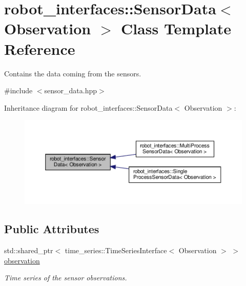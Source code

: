 \hypertarget{classrobot__interfaces_1_1SensorData}{}\section{robot\+\_\+interfaces\+:\+:Sensor\+Data$<$ Observation $>$ Class Template Reference}
\label{classrobot__interfaces_1_1SensorData}


Contains the data coming from the sensors.  




{\ttfamily \#include $<$sensor\+\_\+data.\+hpp$>$}



Inheritance diagram for robot\+\_\+interfaces\+:\+:Sensor\+Data$<$ Observation $>$\+:
\nopagebreak
\begin{figure}[H]
\begin{center}
\leavevmode
\includegraphics[width=350pt]{classrobot__interfaces_1_1SensorData__inherit__graph}
\end{center}
\end{figure}
\subsection*{Public Attributes}
\begin{DoxyCompactItemize}
\item 
\mbox{\label{classrobot__interfaces_1_1SensorData_afb270cde8fa55814d76787589f05ce44}} 
std\+::shared\+\_\+ptr$<$ time\+\_\+series\+::\+Time\+Series\+Interface$<$ Observation $>$ $>$ \hyperlink{classrobot__interfaces_1_1SensorData_afb270cde8fa55814d76787589f05ce44}{observation}
\begin{DoxyCompactList}\small\item\em Time series of the sensor observations. \end{DoxyCompactList}\end{DoxyCompactItemize}


